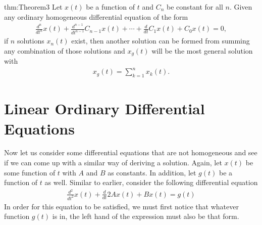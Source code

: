 \begin{theo}{thm:Theorem3}
	Let $x(t)$ be a function of $t$ and $C_n$ be constant for all $n$. Given any ordinary homogeneous differential equation of the form
	\begin{align*}
	\frac{d^n}{dt^n}x(t)+\frac{d^{n-1}}{dt^{n-1}}C_{n-1}x(t)+\cdots+\frac{d}{dt}C_1x(t)+C_0x(t)=0,
	\end{align*}
	if $n$ solutions $x_n(t)$ exist, then another solution can be formed from summing any combination of those solutions and $x_g(t)$ will be the most general solution with
	\begin{align*}
	x_g(t)=\sum_{k=1}^{n}x_k(t).
	\end{align*}
\end{theo} 
















\section{Linear Ordinary Differential Equations}
Now let us consider some differential equations that are not homogeneous and see if we can come up with a similar way of deriving a solution. Again, let $x(t)$ be some function of $t$ with $A$ and $B$ as constants. In addition, let $g(t)$ be a function of $t$ as well. Similar to earlier, consider the following differential equation
\begin{align}
\frac{d^2}{dt^2}x(t)+\frac{d}{dt}2Ax(t)+Bx(t)=g(t)
\end{align}
In order for this equation to be satisfied, we must first notice that whatever function $g(t)$ is in, the left hand of the expression must also be that form. 








